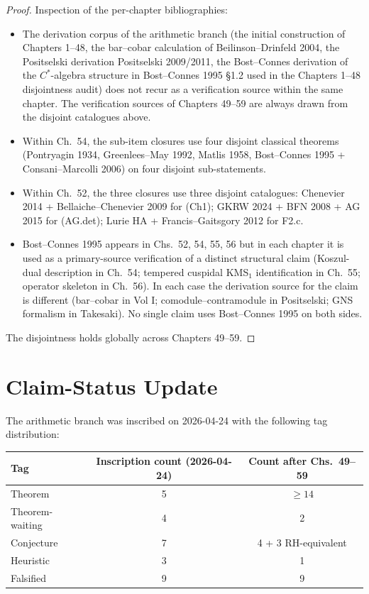 \begin{proof}
Inspection of the per-chapter bibliographies:
\begin{itemize}
\item The derivation corpus of the arithmetic branch (the initial
construction of Chapters 1--48, the bar--cobar calculation of
Beilinson--Drinfeld 2004, the Positselski derivation
Positselski 2009/2011, the Bost--Connes derivation of the
\(C^{*}\)-algebra structure in Bost--Connes 1995 \S 1.2 used in the
Chapters 1--48 disjointness audit) does not recur as a verification source within the
same chapter. The verification sources of Chapters 49--59 are always drawn from
the disjoint catalogues above.
\item Within Ch.~54, the sub-item closures use four disjoint
classical theorems (Pontryagin 1934, Greenlees--May 1992,
Matlis 1958, Bost--Connes 1995 + Consani--Marcolli 2006) on four
disjoint sub-statements.
\item Within Ch.~52, the three closures use three disjoint
catalogues: Chenevier 2014 + Bellaiche--Chenevier 2009 for (Ch1);
GKRW 2024 + BFN 2008 + AG 2015 for (AG.det); Lurie HA +
Francis--Gaitsgory 2012 for F2.c.
\item Bost--Connes 1995 appears in Chs.~52, 54, 55, 56 but in each
chapter it is used as a primary-source verification of a distinct
structural claim (Koszul-dual description in Ch.~54;
tempered cuspidal KMS\({}_{1}\) identification in Ch.~55; operator
skeleton in Ch.~56). In each case the derivation source for the
claim is different (bar--cobar in Vol I; comodule--contramodule in
Positselski; GNS formalism in Takesaki). No single claim uses
Bost--Connes 1995 on both sides.
\end{itemize}
The disjointness holds globally across Chapters 49--59.
\end{proof}

\section{Claim-Status Update}
\label{v4-arith:w5-synth:status-table}

The arithmetic branch was inscribed on 2026-04-24 with the following
tag distribution:

\begin{center}
\begin{tabular}{l|c|c}
Tag & Inscription count (2026-04-24) & Count after Chs.~49--59 \\
\hline
Theorem & 5 & \(\geq 14\) \\
Theorem-waiting & 4 & 2 \\
Conjecture & 7 & 4 + 3 RH-equivalent \\
Heuristic & 3 & 1 \\
Falsified & 9 & 9 \\
\end{tabular}
\end{center}


